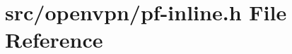 \hypertarget{pf-inline_8h}{}\section{src/openvpn/pf-\/inline.h File Reference}
\label{pf-inline_8h}
